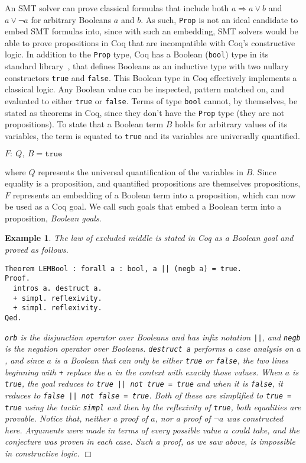 \documentclass[11pt]{article}
\newtheorem{example}{Example}[section]
\begin{document}
	An SMT solver can prove classical 
	formulas that include both 
	$a \Rightarrow a \lor b$ and 
	$a \lor \neg a$ for arbitrary 
	Booleans $a$ and $b$. As
	such, \texttt{Prop} is not an 
	ideal candidate to embed SMT 
	formulas into, since with such 
	an embedding, SMT solvers would 
	be able to prove propositions 
	in Coq that are incompatible with
	Coq's constructive logic. In addition 
	to the \texttt{Prop} 
	type, Coq has a Boolean 
	(\texttt{bool}) type in its standard 
	library~\cite{CoqBool}, that defines 
	Booleans as an 
	inductive type with two nullary
	constructors \texttt{true} and
	\texttt{false}. This Boolean type 
	in Coq effectively implements a 
	classical logic. Any Boolean value can 
	be inspected, pattern matched on,
	and evaluated to either 
	\texttt{true} or \texttt{false}.
	Terms of type \texttt{bool} 
	cannot, by themselves, be 
	stated as theorems
	in Coq, since they don't have 
	the \texttt{Prop} type
	(they are not propositions). 
	To state that a Boolean term 
	$B$ holds for arbitrary values 
	of its variables, the term is 
	equated to \texttt{true}
	and its variables are 
	universally quantified.
	\begin{center}
		$F:\ Q,\ B = \texttt{true}$
	\end{center} 
	where $Q$ represents the 
	universal quantification of 
	the variables in $B$. Since 
	equality is a proposition, 
	and quantified propositions 
	are themselves propositions, 
	$F$ represents an embedding 
	of a Boolean term into a 
	proposition, which can now be
	used as a Coq goal. We 
	call such goals that 
	embed a Boolean term into a 
	proposition, \textit{Boolean
	goals}.
	\begin{example}
		\em The law of 
		excluded middle is 
		stated in Coq as a Boolean
		goal and proved
		as follows.
		\begin{verbatim}
Theorem LEMBool : forall a : bool, a || (negb a) = true.
Proof.
  intros a. destruct a.
  + simpl. reflexivity.
  + simpl. reflexivity.
Qed.
		\end{verbatim}
		\texttt{orb} is the 
		disjunction operator over 
		Booleans and has 
		infix notation \texttt{||},
		and \texttt{negb} is the 
		negation operator over 
		Booleans.
		\texttt{destruct a} performs a 
		case analysis on $a$, and since $a$ 
		is a Boolean that can 
		only be either \texttt{true}
		or \texttt{false}, the two lines
		beginning with \texttt{+} 
		replace the $a$ in the context
		with exactly those values.
		When $a$ is \texttt{true}, the 
		goal reduces to 
		\texttt{true || not true = true}
		and when it is \texttt{false}, it
		reduces to 
		\texttt{false || not false = true}.
		Both of these are simplified to 
		\texttt{true = true} using the 
		tactic \texttt{simpl} and then 
		by the reflexivity of 
		\texttt{true}, both equalities
		are provable. Notice that, 
		neither a proof of $a$, nor 
		a proof of $\neg a$ was 
		constructed here. Arguments were
		made in terms of every possible 
		value $a$ could take, and the
		conjecture was proven in 
		each case. Such a proof, as we 
		saw above, is impossible in 
		constructive logic.
		\hfill$\Box$
	\end{example}
\end{document}
